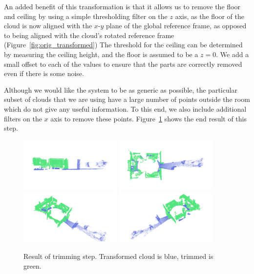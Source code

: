 \documentclass[11pt,a4paper]{kth-mag}
\begin{document}
An added benefit of this transformation is that it allows us to remove the floor
and ceiling by using a simple thresholding filter on the $z$ axis, as the floor
of the cloud is now aligned with the $x$-$y$ plane of the global reference
frame, as opposed to being aligned with the cloud's rotated reference frame
(Figure~\ref{fig:orig_transformed}) The threshold for the ceiling can be
determined by measuring the ceiling height, and the floor is assumed to be a
$z=0$. We add a small offset to each of the values to ensure that the parts are
correctly removed even if there is some noise.

Although we would like the system to be as generic as possible, the particular
subset of clouds that we are using have a large number of points outside the
room which do not give any useful information. To this end, we also include
additional filters on the $x$ axis to remove these points.
Figure~\ref{fig:trimmed} shows the end result of this step.

\begin{figure}
  \centering
  \includegraphics[width=0.45\textwidth]{images/trimmed_side}
  \includegraphics[width=0.45\textwidth]{images/trimmed_top}
  \includegraphics[width=0.45\textwidth]{images/trimmed_diag_left}
  \includegraphics[width=0.45\textwidth]{images/trimmed_diag_right}
  \caption{Result of trimming step. Transformed cloud is blue, trimmed is green.}
  \label{fig:trimmed}
\end{figure}
\end{document}
